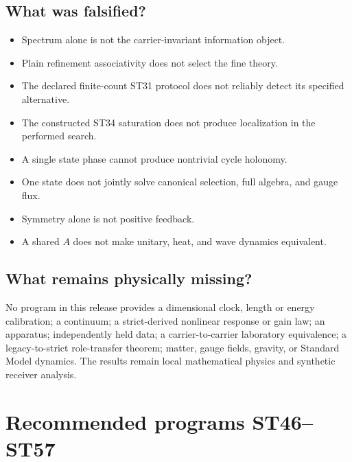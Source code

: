 \documentclass[11pt,a4paper]{article}
\begin{document}
\subsection{What was falsified?}

\begin{itemize}
\item Spectrum alone is not the carrier-invariant information object.
\item Plain refinement associativity does not select the fine theory.
\item The declared finite-count ST31 protocol does not reliably detect its specified alternative.
\item The constructed ST34 saturation does not produce localization in the performed search.
\item A single state phase cannot produce nontrivial cycle holonomy.
\item One state does not jointly solve canonical selection, full algebra, and gauge flux.
\item Symmetry alone is not positive feedback.
\item A shared $A$ does not make unitary, heat, and wave dynamics equivalent.
\end{itemize}

\subsection{What remains physically missing?}

No program in this release provides a dimensional clock, length or energy calibration; a continuum; a strict-derived nonlinear response or gain law; an apparatus; independently held data; a carrier-to-carrier laboratory equivalence; a legacy-to-strict role-transfer theorem; matter, gauge fields, gravity, or Standard Model dynamics. The results remain local mathematical physics and synthetic receiver analysis.

\section{Recommended programs ST46--ST57}
\end{document}
